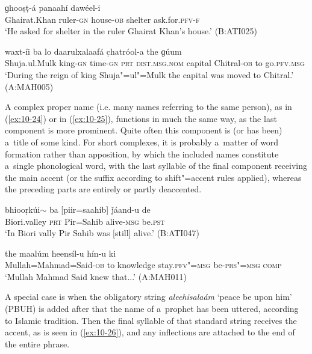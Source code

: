 \begin{exe}
\ex
\label{ex:10-22}
\gll [ɣeyrat"=xaán hakim-í] ɡhooṣṭ-á panaahí dawéel-i \\
Ghairat.Khan ruler-\textsc{gn} house-\textsc{ob} shelter ask.for.\textsc{pfv-f} \\
\glt `He asked for shelter in the ruler Ghairat Khan's house.' (B:ATI025)

\ex
\label{ex:10-23}
 waxt-íi ba lo daarulxalaafá c̣hatróol-a the ɡúum \\
Shuja.ul.Mulk king-\textsc{gn} time-\textsc{gn} \textsc{prt} \textsc{dist.msg.nom}  capital Chitral-\textsc{ob} to go.\textsc{pfv.msg}  \\
\glt `During the reign of king Shuja"=ul"=Mulk the capital was moved to Chitral.' (A:MAH005)
\end{exe}

A complex proper name (i.e. many names referring to the same person), as in (\ref{ex:10-24}) or in (\ref{ex:10-25}), functions in much the same way, as the last component is more prominent. Quite often this component is (or has been) a~title of some kind. For short complexes, it is probably a~matter of word formation rather than apposition, by which the included names constitute a~single phonological word, with the last syllable of the final component receiving the main accent (or the suffix according to shift"=accent rules applied), whereas the preceding parts are entirely or partly deaccented.

\begin{exe}
\ex
\label{ex:10-24}
\gll bhiooṛkúi$\sim$ ba [piir=saahíb] ǰáand-u de \\
Biori.valley \textsc{prt} Pir=Sahib alive-\textsc{msg} be.\textsc{pst} \\
\glt `In Biori vally Pir Sahib was [still] alive.' (B:ATI047)

\ex
\label{ex:10-25}
\gll [mulaa=mhaamad=seed-á] the maalúm heensíl-u hín-u ki \\
Mullah=Mahmad=Said-\textsc{ob} to knowledge stay.\textsc{pfv"=msg} be-\textsc{prs"=msg} \textsc{comp} \\
\glt `Mullah Mahmad Said knew that...' (A:MAH011)
\end{exe}

A special case is when the obligatory string \textit{aleehisalaám} `peace be upon him' (PBUH) is added after that the name of a~prophet has been uttered, according to Islamic tradition. Then the final syllable of that standard string receives the accent, as is seen in (\ref{ex:10-26}), and any inflections are attached to the end of the entire phrase.

